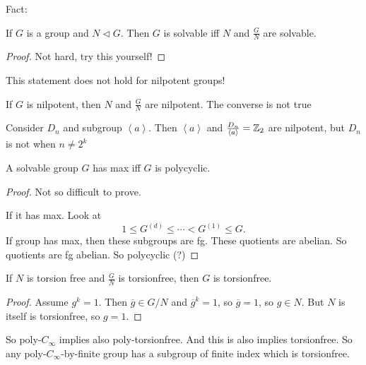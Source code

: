 
Fact:

\begin{prop}
    If $G$ is a group and $N \triangleleft G$.
    Then $G$ is solvable iff $N$ and  $\frac{G}{N}$ are solvable.
\end{prop}
\begin{proof}
    Not hard, try this yourself!
\end{proof}

This statement does not hold for nilpotent groups!

\begin{prop}
    If $G$ is nilpotent, then $N$ and $\frac{G}{N}$ are nilpotent. The converse is not true
\end{prop}
\begin{eg}
    Consider $D_n$ and subgroup $\left<a \right>$.
    Then $\left<a \right>$ and $\frac{D_n}{\left<a \right>} = \mathbb{Z}_2$ are nilpotent, but $D_n$ is not when $n \neq 2^{k}$
\end{eg}

\begin{theorem}
    A solvable group $G$ has max iff $G$ is polycyclic.
\end{theorem}
\begin{proof}
    Not so difficult to prove.

    If it has max. 
    Look at
    \[
        1 \le  G^{(d)} \le  \cdots < G^{(1)} \le G
    .\] 
    If group has max, then these subgroups are fg. These quotients are abelian.
    So quotients are fg abelian. So polycyclic (?)
\end{proof}



\begin{prop}
    If $N$ is torsion free and $\frac{G}{N}$ is torsionfree, then $G$ is torsionfree.
\end{prop}
\begin{proof}
    Assume $g^{k}=1$. Then $\overline{g} \in G / N$ and $\overline{g}^{k} = 1$, so $\overline{g} = 1$, so $g \in N$. But $N$ is itself is torsionfree, so $g = 1$.
\end{proof}

\begin{remark}
    So poly-$C_{\infty}$ implies also poly-torsionfree. And this is also implies torsionfree.
    So any poly-$C_{\infty}$-by-finite group has a subgroup of finite index which is torsionfree.
\end{remark}

